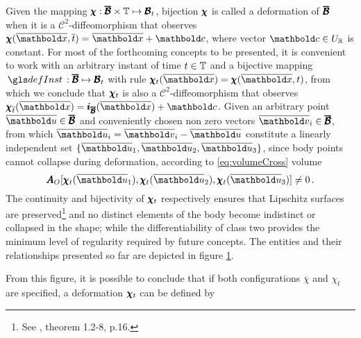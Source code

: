 Given the mapping $\pmb{\chi} : \pmb{\overline{\mathcal{B}}}\times\mathbb{T} \mapsto \pmb{\mathcal{B}}_t$, bijection $\pmb{\chi}$ is called a deformation of $\pmb{\overline{\mathcal{B}}}$ when it is a $\mathcal{C}^{2}$-diffeomorphism that observes $\fua{\tnr{\chi}}{\overline{\vto{x}},\overline{t}}=\overline{\vto{x}}+\vto{c}$, where vector $\vto{c}\in U_\real$ is constant. For most of the forthcoming concepts to be presented, it is convenient to work with an arbitrary instant of time $t\in\mathbb{T}$ and a bijective mapping $\map{\gloref{defInst}}{\tnr{\overline{\mathcal{B}}}}{\tnr{\mathcal{B}}_t}$ with rule $\fua{\tnr{\chi}_t}{\overline{\vto{x}}}=\fua{\tnr{\chi}}{\overline{\vto{x}},t}$, from which we conclude that $\pmb{\chi}_t$ is also a $\mathcal{C}^{2}$-diffeomorphism that observes $\tnr{\chi}_{\overline{t}}(\overline{\vto{x}})=\tnr{i}_{\tnr{\overline{\mathcal{B}}}}(\overline{\vto{x}})+\vto{c}$. Given an arbitrary point $\overline{\vto{u}}\in\tnr{\overline{\mathcal{B}}}$ and conveniently chosen non zero vectors $\overline{\vto{v}}_i\in\tnr{\overline{\mathcal{B}}}$, from which $\overline{\vto{u}}_i=\overline{\vto{v}}_i-\overline{\vto{u}}$ constitute a linearly independent set $\{ \overline{\vto{u}}_1,\overline{\vto{u}}_2,\overline{\vto{u}}_3\}$, since body points cannot collapse during deformation, according to \eqref{eq:volumeCross} volume
\begin{equation}
{\tnr{A}_O}[\fua{\tnr{\chi}_t}{\overline{\vto{u}}_1},\fua{\tnr{\chi}_t}{\overline{\vto{u}}_2},\fua{\tnr{\chi}_t}{\overline{\vto{u}}_3}]\neq 0\,.
\end{equation}
The continuity and bijectivity of $\pmb{\chi}_t$ respectively ensures that Lipschitz surfaces are preserved\footnote{See \cite{ciarlet_1988_2_2}, theorem 1.2-8, p.16.} and no distinct elements of the body become indistinct or collapsed in the shape; while the differentiability of class two provides the minimum level of regularity required by future concepts. The entities and their relationships presented so far are depicted in figure \ref{fg:deformacao}. 
\begin{figure}[!ht]
\centering
\begin{center}
\scalebox{.72}{}
\end{center}
\label{fg:deformacao}
\end{figure}
From this figure, it is possible to conclude that if both configurations $\overline{\chi}$ and $\chi_t$ are specified, a deformation $\pmb{\chi}_t$ can be defined by 
